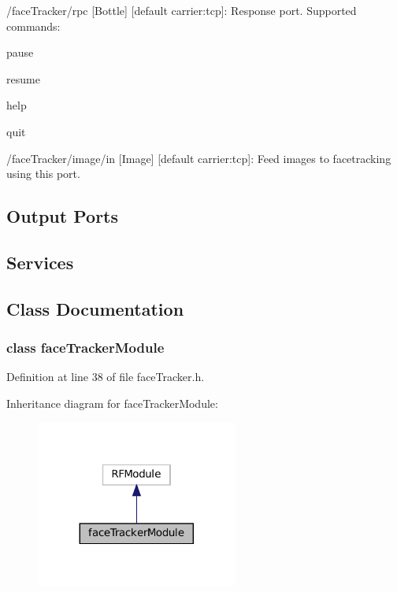 \begin{DoxyItemize}
\item /face\+Tracker/rpc \mbox{[}Bottle\mbox{]} \mbox{[}default carrier\+:tcp\mbox{]}\+: Response port. Supported commands\+:
\begin{DoxyItemize}
\item pause
\item resume
\item help
\item quit
\end{DoxyItemize}
\item /face\+Tracker/image/in \mbox{[}Image\mbox{]} \mbox{[}default carrier\+:tcp\mbox{]}\+: Feed images to facetracking using this port.
\end{DoxyItemize}\hypertarget{group__touchDetector_outputports_sec}{}\subsection{Output Ports}\label{group__touchDetector_outputports_sec}
\hypertarget{group__touchDetector_services_sec}{}\subsection{Services}\label{group__touchDetector_services_sec}


\subsection{Class Documentation}
\label{classfaceTrackerModule}
\subsubsection{class face\+Tracker\+Module}


Definition at line 38 of file face\+Tracker.\+h.



Inheritance diagram for face\+Tracker\+Module\+:
\nopagebreak
\begin{figure}[H]
\begin{center}
\leavevmode
\includegraphics[width=188pt]{classfaceTrackerModule__inherit__graph}
\end{center}
\end{figure}
